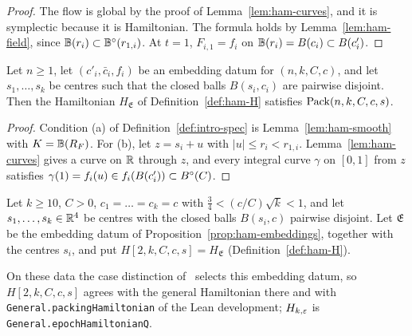\begin{proof}
The flow is global by the proof of Lemma~\ref{lem:ham-curves}, and it is symplectic because it is Hamiltonian. The formula holds by Lemma~\ref{lem:ham-field}, since $\mathbb{B}(r_i)\subset\mathbb{B}^\circ(r_{1,i})$. At $t=1$, $F_{i,1}=f_i$ on $\mathbb{B}(r_i)=B(c_i)\subset B(c'_i)$.
\end{proof}

\begin{proposition}\label{prop:ham-end}
Let $n\ge1$, let $(c'_i,\bar c_i,f_i)$ be an embedding datum for $(n,k,C,c)$, and let $s_1,\dots,s_k$ be centres such
that the closed balls $B(s_i,c_i)$ are pairwise disjoint. Then the Hamiltonian $H_{\mathfrak E}$ of
Definition~\ref{def:ham-H} satisfies $\mathrm{Pack}(n,k,C,c,s)$.
\end{proposition}

\begin{proof}
Condition (a) of Definition~\ref{def:intro-spec} is Lemma~\ref{lem:ham-smooth} with $K=\mathbb{B}(R_F)$. For (b), let $z=s_i+u$ with $|u|\le r_i<r_{1,i}$. Lemma~\ref{lem:ham-curves} gives a curve on $\mathbb{R}$ through $z$, and every integral curve $\gamma$ on $[0,1]$ from $z$ satisfies $\gamma(1)=f_i(u)\in f_i(B(c'_i))\subset B^{\circ}(C)$.
\end{proof}

\begin{definition}\label{def:ham-H-final}
Let $k\ge10$, $C>0$, $c_1=\dots=c_k=c$ with $\frac34<(c/C)\sqrt k<1$, and let $s_1,\dots,s_k\in\mathbb{R}^4$ be centres with the
closed balls $B(s_i,c)$ pairwise disjoint. Let $\mathfrak E$ be the embedding datum of
Proposition~\ref{prop:ham-embeddings}, together with the centres $s_i$, and put
$H[2,k,C,c,s]=H_{\mathfrak E}$ (Definition~\ref{def:ham-H}).
\end{definition}

\begin{remark}\label{rem:ham-general}
On these data the case distinction of~\cite{SongHD} selects this embedding datum, so $H[2,k,C,c,s]$ agrees with the
general Hamiltonian there and with \texttt{General.packingHamiltonian} of the Lean development; $H_{k,\varepsilon}$ is
\texttt{General.epochHamiltonianQ}.
\end{remark}

